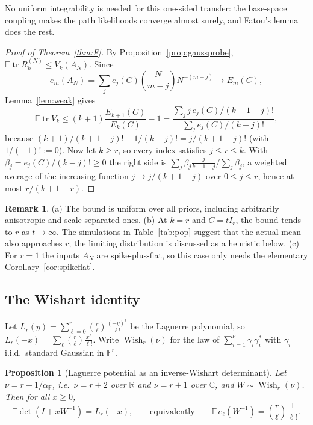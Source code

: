 \documentclass[11pt,a4paper]{article}
\newtheorem{proposition}[theorem]{Proposition}
\theoremstyle{definition}
\newtheorem{remark}[theorem]{Remark}
\newcommand{\E}{\mathbb{E}}
\newcommand{\R}{\mathbb{R}}
\newcommand{\C}{\mathbb{C}}
\newcommand{\F}{\mathbb{F}}
\newcommand{\tr}{\operatorname{tr}}
\newcommand{\Wish}{\operatorname{Wish}}
\begin{document}
No uniform integrability is needed for this one-sided transfer: the base-space coupling makes the path likelihoods converge almost surely, and Fatou's lemma does the rest.

\begin{proof}[Proof of Theorem~\ref{thm:F}]
By Proposition~\ref{prop:gaussprobe}, $\E\tr R^{(N)}_k\le V_k(A_N)$. Since
\[
e_m(A_N)=\sum_je_j(C)\binom N{m-j}N^{-(m-j)}\longrightarrow E_m(C),
\]
Lemma~\ref{lem:weak} gives
\[
\E\tr V_k\le(k+1)\frac{E_{k+1}(C)}{E_k(C)}-1=\frac{\sum_jj\,e_j(C)/(k+1-j)!}{\sum_je_j(C)/(k-j)!},
\]
because $(k+1)/(k+1-j)!-1/(k-j)!=j/(k+1-j)!$ (with $1/(-1)!:=0$). Now let $k\ge r$, so every index satisfies $j\le r\le k$. With $\beta_j=e_j(C)/(k-j)!\ge0$ the right side is $\sum_j\beta_j\frac{j}{k+1-j}\big/\sum_j\beta_j$, a weighted average of the increasing function $j\mapsto j/(k+1-j)$ over $0\le j\le r$, hence at most $r/(k+1-r)$.
\end{proof}

\begin{remark}
(a) The bound is uniform over all priors, including arbitrarily anisotropic and scale-separated ones. (b) At $k=r$ and $C=tI_r$, the bound tends to $r$ as $t\to\infty$. The simulations in Table~\ref{tab:pop} suggest that the actual mean also approaches $r$; the limiting distribution is discussed as a heuristic below. (c) For $r=1$ the inputs $A_N$ are spike-plus-flat, so this case only needs the elementary Corollary~\ref{cor:spikeflat}.
\end{remark}

\subsection{The Wishart identity}
Let $L_r(y)=\sum_{\ell=0}^r\binom r\ell\frac{(-y)^\ell}{\ell!}$ be the Laguerre polynomial, so $L_r(-x)=\sum_\ell\binom r\ell\frac{x^\ell}{\ell!}$. Write $\Wish_r(\nu)$ for the law of $\sum_{i=1}^\nu\gamma_i\gamma_i^*$ with $\gamma_i$ i.i.d.\ standard Gaussian in $\F^r$.

\begin{proposition}[Laguerre potential as an inverse-Wishart determinant]\label{prop:wishart}
Let $\nu=r+1/\alpha_\F$, i.e.\ $\nu=r+2$ over $\R$ and $\nu=r+1$ over $\C$, and $W\sim\Wish_r(\nu)$. Then for all $x\ge0$,
\[
\E\det(I+xW^{-1})=L_r(-x),\qquad\text{equivalently}\qquad \E\,e_\ell(W^{-1})=\binom r\ell\frac1{\ell!}.
\]
\end{proposition}
\end{document}

